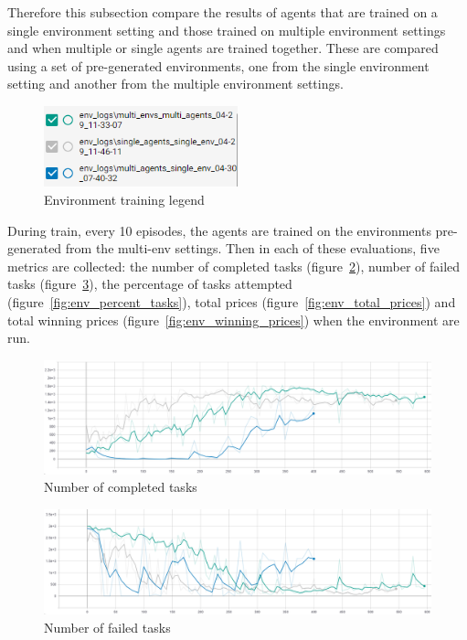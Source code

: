 Therefore this subsection compare the results of agents that are trained on a single environment setting and those
trained on multiple environment settings and when multiple or single agents are trained together.
These are compared using a set of pre-generated environments, one from the single environment setting and another from
the multiple environment settings.

\begin{figure}
    \includegraphics[width=0.5\textwidth]{figures/4_test_eval_figs/env_training_fig/legend.png}
    \caption{Environment training legend}
    \label{fig:env-training-legend}
\end{figure}

During train, every 10 episodes, the agents are trained on the environments pre-generated from the multi-env settings.
Then in each of these evaluations, five metrics are collected: the number of completed tasks
(figure~\ref{fig:env_num_completed_tasks}), number of failed tasks (figure~\ref{fig:env_num_failed_tasks}),
the percentage of tasks attempted (figure~\ref{fig:env_percent_tasks}), total prices (figure~\ref{fig:env_total_prices})
and total winning prices (figure~\ref{fig:env_winning_prices}) when the environment are run. \\

\begin{figure}[H]
    \centering
    \includegraphics[width=17cm]{figures/4_test_eval_figs/env_training_fig/num_completed_tasks.png}
    \caption{Number of completed tasks}
    \label{fig:env_num_completed_tasks}
\end{figure}

\begin{figure}[H]
    \centering
    \includegraphics[width=17cm]{figures/4_test_eval_figs/env_training_fig/num_failed_tasks.png}
    \caption{Number of failed tasks}
    \label{fig:env_num_failed_tasks}
\end{figure}

